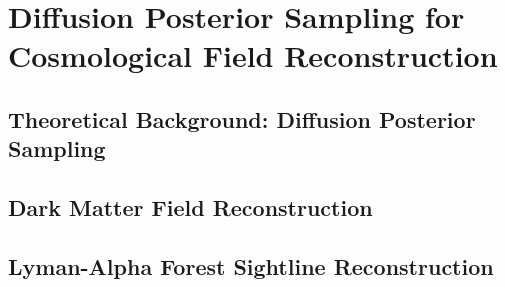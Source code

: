 \chapter{Diffusion Posterior Sampling for Cosmological Field Reconstruction}
\label{ch:dps}


\section{Theoretical Background: Diffusion Posterior Sampling}
\label{sec:dps_theory}
\lipsum[1-2]

\section{Dark Matter Field Reconstruction}
\label{sec:dps_dm}
\lipsum[1-2]

\section{Lyman-Alpha Forest Sightline Reconstruction}
\label{sec:dps_lya}
\lipsum[1-2]
